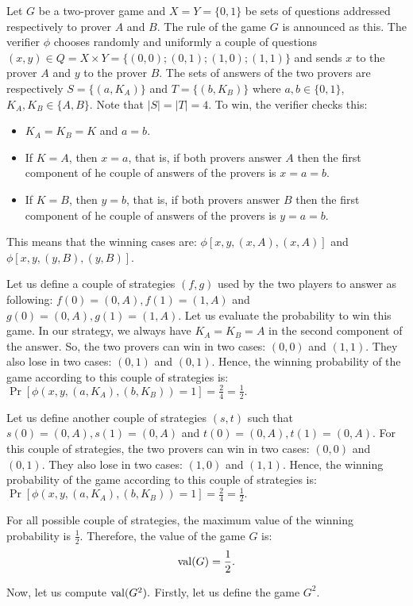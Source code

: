 Let $G$ be a two-prover game and  $X=Y=\{0,1\}$ be sets of questions addressed respectively to prover $A$ and $B$. The rule of the game $G$ is announced as this. The verifier $\phi$ chooses randomly and uniformly a couple of questions $(x,y) \in Q=X \times Y=\{(0,0);(0,1);(1,0);(1,1)\}$ and sends $x$ to the prover $A$ and $y$ to the prover $B$. The sets of answers of the  two provers are  respectively  $S=\{(a,K_A)\}$ and $T=\{(b,K_B)\}$ where $a,b \in \{0,1\}$,  $K_A,K_B \in \{A,B\}$. Note that $|S|=|T|=4.$ To win, the verifier checks this: \begin{itemize}
\item $K_A=K_B=K$ and $a=b$.
\item  If $K=A$, then $x=a$, that is,  if both provers answer $A$ then the  first component of he couple of  answers of the provers is $x=a=b$.
\item If $K=B$, then $y=b$, that is,  if both provers answer $B$ then the  first component of he couple of  answers of the provers is $y=a=b$.
\end{itemize}
This means that the winning cases are: $\phi[x,y, (x,A), (x,A)]$ and $\phi[x,y, (y,B), (y,B)]$.

Let us define a couple of strategies $(f,g)$ used by the two players to answer as following:  $f(0)=(0,A), f(1)=(1,A)$ and  $g(0)=(0,A), g(1)=(1,A)$.
 Let us evaluate the probability to win this game. In our strategy, we always have $K_A=K_B=A$ in the second component of the answer. So, the two provers can win in two cases: $(0,0)$ and $(1,1)$. They also lose  in two cases: $(0,1)$ and $(0,1)$. Hence, the winning probability of the game according to this couple of strategies is: $\Pr [\phi(x,y, (a,K_A), (b,K_B))=1]=\frac{2}{4}=\frac{1}{2}.$
 
 Let us define another couple of strategies $(s,t)$ such that $s(0)=(0,A), s(1)=(0,A)$ and  $t(0)=(0,A), t(1)=(0,A)$. For this couple of strategies, the two provers can win in two cases: $(0,0)$ and $(0,1)$. They also lose  in two cases: $(1,0)$ and $(1,1)$. Hence, the winning probability of the game according to this couple of strategies is: $\Pr [\phi(x,y, (a,K_A), (b,K_B))=1]=\frac{2}{4}=\frac{1}{2}.$

For all possible couple of strategies, the maximum value of the winning probability is $\frac{1}{2}$. Therefore, the value of the game $G$  is: $$\mathrm{val} (G)= \frac{1}{2}.$$
 
Now, let us compute $\mathrm{val} (G^2).$ Firstly, let us define the game $G^2.$


